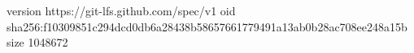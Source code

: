 version https://git-lfs.github.com/spec/v1
oid sha256:f10309851c294dcd0db6a28438b58657661779491a13ab0b28ac708ee248a15b
size 1048672
